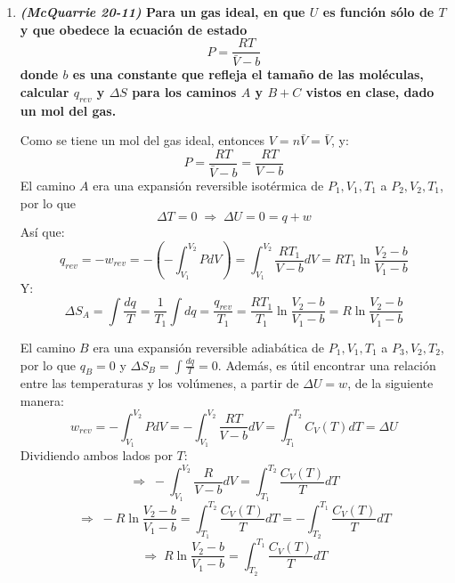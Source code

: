 \documentclass[a4paper,12pt]{article}
\begin{document}
\begin{enumerate}
\begin{center}
\begin{tabular}{r c l}
 $\Delta S_G$ & $=$ & $\int\frac{dq}{T}=\int\frac{dU-dw}{T}=\int_{T_4}^{T_1}\frac{C_V(T)}{T}dT+\int_{V_1}^{V_2}\frac{P}{T}dV$ \\
& $=$ & $\int_{T_4}^{T_1}\frac{C_V(T)}{T}dT+nR\int_{V_1}^{V_2}\frac{dV}{V}=\int_{T_4}^{T_1}\frac{C_V(T)}{T}dT+nR\ln\frac{V_2}{V_1}$
\end{tabular}
\end{center}

As\'i que para el proceso total $F+G$, tenemos que:
$$w_{F+G}=w_{F}+w_{G}=0-P_2(V_2-V_1)=-P_2(V_2-V_1)$$
$$q_{F+G}=q_{F}+q_{G}=\int_{T_1}^{T_4}C_V(T)dT+\int_{T_4}^{T_1}C_V(T)dT+P_2(V_2-V_1)=P_2(V_2-V_1)$$
$$\Delta U_{F+G}=\Delta U_{F}+\Delta U_{G}=\int_{T_4}^{T_1}C_V(T)dT+\int_{T_4}^{T_1}C_V(T)dT=0$$
$$\Delta H_{F+G}=\Delta H_{F}+\Delta H_{G}=\int_{T_4}^{T_1}C_P(T)dT+\int_{T_4}^{T_1}C_P(T)dT=0$$
$$\Delta S_{F+G}=\Delta S_{F}+\Delta S_{G}=\int_{T_1}^{T_4}\frac{C_V(T)}{T}dT+\int_{T_4}^{T_1}\frac{C_V(T)}{T}dT+nR\ln\frac{V_2}{V_1}=nR\ln\frac{V_2}{V_1}$$

Que para las funciones de estado ($\Delta U$, $\Delta H$ y $\Delta S$) es lo mismo que para los caminos $A$, $B+C$ y $D+E$ vistos en clase, mientras que para $w$ y $q$ es diferente para cada camino (no son funciones de estado).

 \item \textbf{\textit{(McQuarrie 20-11)} Para un gas ideal, en que $U$ es funci\'on s\'olo de $T$ y que obedece la ecuaci\'on de estado
$$P=\frac{RT}{\bar{V}-b}$$
donde $b$ es una constante que refleja el tama\~no de las mol\'eculas, calcular $q_{rev}$ y $\Delta S$ para los caminos $A$ y $B+C$ vistos en clase, dado un mol del gas.} %

Como se tiene un mol del gas ideal, entonces $V=n\bar{V}=\bar{V}$, y: 
$$P=\frac{RT}{\bar{V}-b}=\frac{RT}{V-b}$$ 
El camino $A$ era una expansi\'on reversible isot\'ermica de $P_1,V_1,T_1$ a $P_2,V_2,T_1$, por lo que 
$$\Delta T=0\;\Rightarrow\;\Delta U=0=q+w$$
As\'i que:
$$q_{rev}=-w_{rev}=-\left(-\int_{V_1}^{V_2}PdV\right)=\int_{V_1}^{V_2}\frac{RT_1}{V-b}dV=RT_1\ln\frac{V_2-b}{V_1-b}$$
Y:
$$\Delta S_A=\int{\frac{dq}{T}}=\frac{1}{T_1}\int dq=\frac{q_{rev}}{T_1}=\frac{RT_1}{T_1}\ln\frac{V_2-b}{V_1-b}=R\ln\frac{V_2-b}{V_1-b}$$

El camino $B$ era una expansi\'on reversible adiab\'atica de $P_1,V_1,T_1$ a $P_3,V_2,T_2$, por lo que $q_B=0$ y $\Delta S_B=\int{\frac{dq}{T}}=0$. Adem\'as, es \'util encontrar una relaci\'on entre las temperaturas y los vol\'umenes, a partir de $\Delta U=w$, de la siguiente manera:
$$w_{rev}=-\int_{V_1}^{V_2}PdV=-\int_{V_1}^{V_2}\frac{RT}{V-b}dV=\int_{T_1}^{T_2}C_V(T)dT=\Delta U$$
Dividiendo ambos lados por $T$:
$$\Rightarrow\;-\int_{V_1}^{V_2}\frac{R}{V-b}dV=\int_{T_1}^{T_2}\frac{C_V(T)}{T}dT$$
$$\Rightarrow\;-R\ln\frac{V_2-b}{V_1-b}=\int_{T_1}^{T_2}\frac{C_V(T)}{T}dT=-\int_{T_2}^{T_1}\frac{C_V(T)}{T}dT$$
$$\Rightarrow\;R\ln\frac{V_2-b}{V_1-b}=\int_{T_2}^{T_1}\frac{C_V(T)}{T}dT$$


\end{enumerate}
\end{document}
